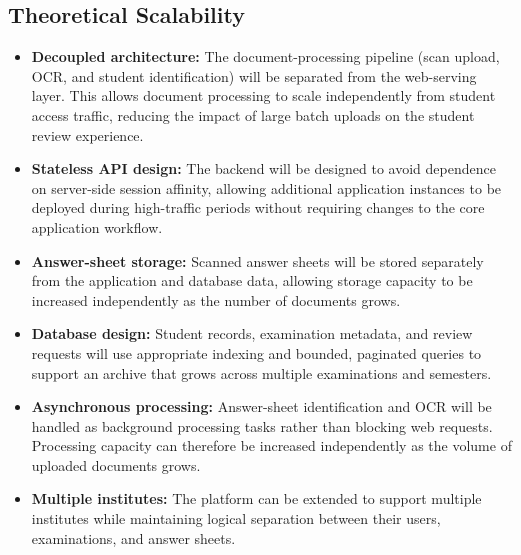 \documentclass[11pt,a4paper]{article}
\begin{document}
\subsection{Theoretical Scalability}
\begin{itemize}[leftmargin=0.7cm]
    \item \textbf{Decoupled architecture:} The document-processing pipeline (scan upload, OCR, and student identification) will be separated from the web-serving layer. This allows document processing to scale independently from student access traffic, reducing the impact of large batch uploads on the student review experience.
    \item \textbf{Stateless API design:} The backend will be designed to avoid dependence on server-side session affinity, allowing additional application instances to be deployed during high-traffic periods without requiring changes to the core application workflow.
    \item \textbf{Answer-sheet storage:} Scanned answer sheets will be stored separately from the application and database data, allowing storage capacity to be increased independently as the number of documents grows.
    \item \textbf{Database design:} Student records, examination metadata, and review requests will use appropriate indexing and bounded, paginated queries to support an archive that grows across multiple examinations and semesters.
    \item \textbf{Asynchronous processing:} Answer-sheet identification and OCR will be handled as background processing tasks rather than blocking web requests. Processing capacity can therefore be increased independently as the volume of uploaded documents grows.
    \item \textbf{Multiple institutes:} The platform can be extended to support multiple institutes while maintaining logical separation between their users, examinations, and answer sheets.
\end{itemize}
\end{document}
